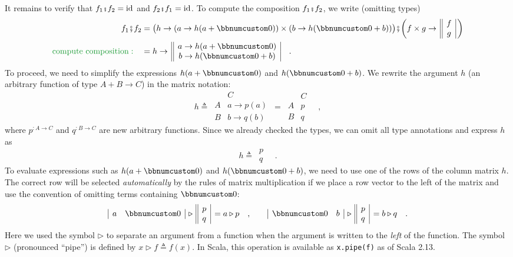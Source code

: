 It remains to verify that $f_{1}\bef f_{2}=\text{id}$ and $f_{2}\bef f_{1}=\text{id}$.
To compute the composition $f_{1}\bef f_{2}$, we write (omitting
types)
\begin{align*}
f_{1}\bef f_{2} & =\big(h\rightarrow(a\rightarrow h(a+\bbnum 0))\times(b\rightarrow h(\bbnum 0+b))\big)\bef\bigg(f\times g\rightarrow\,\begin{array}{||c|}
f\\
g
\end{array}\,\bigg)\\
{\color{greenunder}\text{compute composition}:}\quad & =h\rightarrow\,\begin{array}{||c|}
a\rightarrow h(a+\bbnum 0)\\
b\rightarrow h(\bbnum 0+b)
\end{array}\quad.
\end{align*}
To proceed, we need to simplify the expressions $h(a+\bbnum 0)$ and
$h(\bbnum 0+b)$. We rewrite the argument $h$ (an arbitrary function
of type $A+B\rightarrow C$) in the matrix notation:
\[
h\triangleq\,\begin{array}{|c||c|}
 & C\\
\hline A & a\rightarrow p(a)\\
B & b\rightarrow q(b)
\end{array}\,=\,\begin{array}{|c||c|}
 & C\\
\hline A & p\\
B & q
\end{array}\quad,
\]
where $p^{:A\rightarrow C}$ and $q^{:B\rightarrow C}$ are new arbitrary
functions. Since we already checked the types, we can omit all type
annotations and express $h$ as
\[
h\triangleq\,\begin{array}{||c|}
p\\
q
\end{array}\quad.
\]
To evaluate expressions such as $h(a+\bbnum 0)$ and $h(\bbnum 0+b)$,
we need to use one of the rows of the column matrix $h$. The correct
row will be selected \emph{automatically} by the rules of matrix multiplication
if we place a row vector to the left of the matrix and use the convention
of omitting terms containing $\bbnum 0$:
\[
\begin{array}{|cc|}
a & \bbnum 0\end{array}\,\triangleright\,\begin{array}{||c|}
p\\
q
\end{array}\,=a\triangleright p\quad,\quad\quad\begin{array}{|cc|}
\bbnum 0 & b\end{array}\,\triangleright\,\begin{array}{||c|}
p\\
q
\end{array}\,=b\triangleright q\quad.
\]
Here we used the symbol $\triangleright$ to separate an argument
from a function when the argument is written to the \emph{left} of
the function. The symbol $\triangleright$ (pronounced \textsf{``}pipe\textsf{''})
is defined by $x\triangleright f\triangleq f(x)$. In Scala, this
operation is available as \lstinline!x.pipe(f)! as of Scala 2.13.

